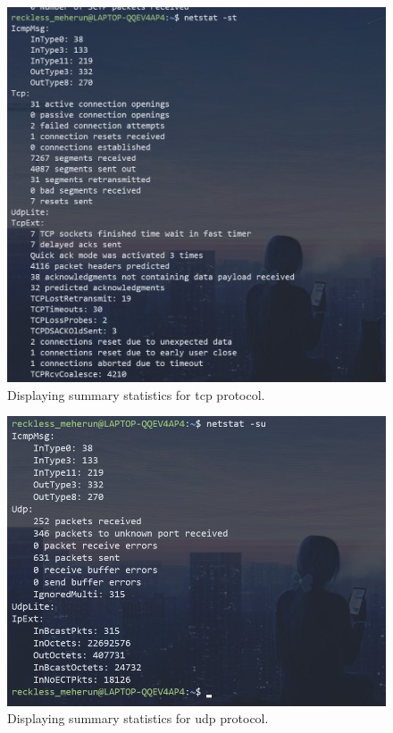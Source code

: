 \documentclass[11pt]{article}
\begin{document}
\begin{figure}[H]
	\centering
	\includegraphics[width=\textwidth]{res/netstat 10.png}
	\caption{Displaying summary statistics for tcp protocol.}
\end{figure}
\begin{figure}[H]
	\centering
	\includegraphics[width=\textwidth]{res/netstat 11.png}
	\caption{Displaying summary statistics for udp protocol.}
\end{figure}
\end{document}
